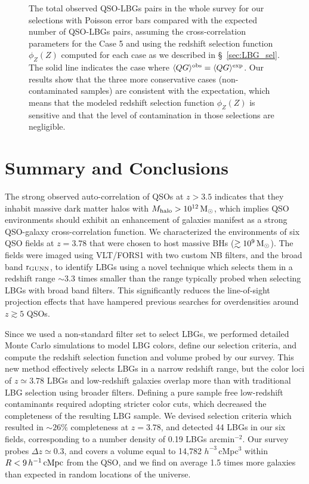 \documentclass[iop, revtex4]{emulateapj}
\begin{document}
\begin{figure}[t!]
\begin{center}
\caption{The total observed QSO-LBGs pairs in the whole survey for our selections with Poisson error bars compared with the expected number of QSO-LBGs pairs, assuming the cross-correlation parameters for the Case 5 and using the redshift selection function $\phi_{Z}(Z)$ computed for each case as we described in \S~\ref{sec:LBG_sel}. The solid line indicates the case where $\langle
QG\rangle^{\rm obs}=\langle QG\rangle^{\rm exp}$. Our results show that the three more conservative cases (non-contaminated samples) are consistent with the expectation, which means that the modeled redshift selection function $\phi_{Z}(Z)$  is sensitive and that the level of contamination in those selections are negligible. \\}   
\label{fig:compar_QG}
\end{center}
\end{figure} 

\section{Summary and Conclusions}
\label{sec:summ}

The strong observed auto-correlation of QSOs at $z>3.5$ indicates that they inhabit massive dark matter 
halos with $M_{\rm halo} > 10^{12}\,\rm M_{\odot}$, which implies
QSO environments should exhibit an enhancement of galaxies manifest
as a strong QSO-galaxy cross-correlation function.
We characterized the environments of six
QSO fields at $z=3.78$ that were chosen to host massive BHs
($\gtrsim 10^{9}\,\rm M_{\odot}$). The fields were imaged
using
VLT/FORS1 with two custom NB filters, and the broad band $\rm r_{GUNN}$,
to identify LBGs using a novel technique which selects them in a redshift
range $\sim3.3$ times smaller than the range typically
probed when selecting LBGs with broad band filters. This significantly
reduces the line-of-sight projection effects that have hampered previous
searches for overdensities around $z\gtrsim 5$ QSOs.

Since we used a non-standard filter set to select LBGs, we performed
detailed Monte Carlo simulations to model LBG colors, define
our selection criteria, and compute the
redshift selection function and volume probed by our survey.
This new method effectively selects LBGs in a narrow redshift range, but the color loci of
$z \simeq 3.78$ LBGs and low-redshift galaxies overlap more than with
traditional LBG selection using broader filters.  Defining a pure sample
free low-redshift contaminants required adopting stricter color cuts, which decreased the
completeness of the resulting LBG sample. We devised selection criteria
which resulted in $\sim26\%$ completeness at $z=3.78$, and detected 44 LBGs in our six
fields, corresponding to a number density of 0.19 LBGs arcmin$^{-2}$. 
Our survey probes $\Delta z\simeq 0.3$, and covers a volume equal to 14,782 $h^{-3}$\,cMpc$^{3}$
within $R < 9\,h^{-1}\,{\rm cMpc}$
from the QSO, and we find  on average 1.5 times more galaxies than expected in
random locations of the universe. 
\end{document}
